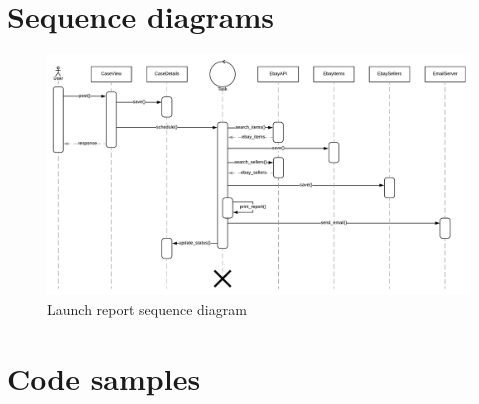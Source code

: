 \section{Sequence diagrams}

\begin{figure}[H]
\centering
\includegraphics[angle=90, scale=0.7]{imgs/SequenceDiagram.pdf}
\caption{Launch report sequence diagram}
\label{fig:sysarch}
\end{figure}

\section{Code samples}
